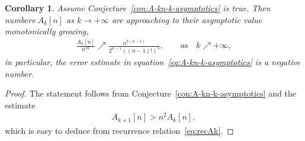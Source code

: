 \documentclass[pdftex]{sigma}
\numberwithin{equation}{section}
\newtheorem{Corollary}[Theorem]{Corollary}
\begin{document}
\begin{Corollary}Assume Conjecture~{\rm \ref{con:A-kn-k-asymptotics}} is true. Then numbers $A_k[n]$ as $k\to+\infty$ are approaching
to their asymptotic value monotonically growing,
\begin{gather*}
\frac{A_k[n]}{n^{2k}}\nearrow\frac{n^{3(n-1)}}{2^{n-1}\left((n-1)!\right)^3},\qquad\mathrm{as}\quad k\nearrow+\infty,
\end{gather*}
in particular, the error estimate in equation~\eqref{eq:A-kn-k-asymptotics} is a negative number.
\end{Corollary}
\begin{proof}
The statement follows from Conjecture~\ref{con:A-kn-k-asymptotics} and the estimate
\begin{gather*}
A_{k+1}[n]>n^2A_k[n],
\end{gather*}
which is easy to deduce from recurrence relation~\eqref{eq:recAk}.
\end{proof}
\end{document}
